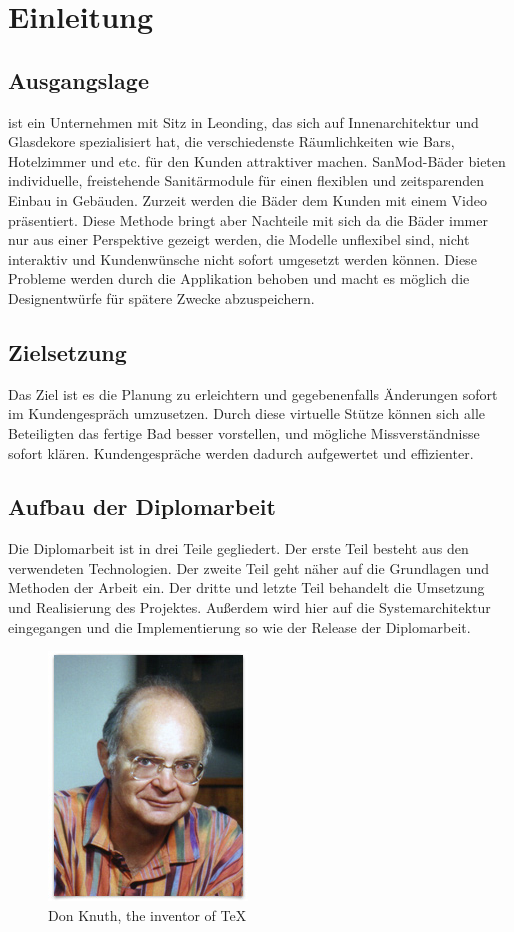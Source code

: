 \chapter{Einleitung}
\section{Ausgangslage}
{\projectpartner} ist ein Unternehmen mit Sitz in Leonding, das sich auf Innenarchitektur und Glasdekore spezialisiert hat, die verschiedenste Räumlichkeiten wie Bars, Hotelzimmer und etc. für den Kunden attraktiver machen. SanMod-Bäder bieten individuelle, freistehende Sanitärmodule für einen flexiblen und zeitsparenden Einbau in Gebäuden. Zurzeit werden die Bäder dem Kunden mit einem Video präsentiert. Diese Methode bringt aber Nachteile mit sich da die Bäder immer nur aus einer Perspektive gezeigt werden, die Modelle unflexibel sind, nicht interaktiv und Kundenwünsche nicht sofort umgesetzt werden können. Diese Probleme werden durch die Applikation behoben und macht es möglich die Designentwürfe für spätere Zwecke abzuspeichern.

\section{Zielsetzung}
Das Ziel ist es die Planung zu erleichtern und gegebenenfalls Änderungen sofort im Kundengespräch umzusetzen. Durch diese virtuelle Stütze können sich alle Beteiligten das fertige Bad besser vorstellen, und mögliche Missverständnisse sofort klären. Kundengespräche werden dadurch aufgewertet und effizienter.

\section{Aufbau der Diplomarbeit}
Die Diplomarbeit ist in drei Teile gegliedert. 
Der erste Teil besteht aus den verwendeten Technologien.
Der zweite Teil geht näher auf die Grundlagen und Methoden der Arbeit ein.
Der dritte und letzte Teil behandelt die Umsetzung und Realisierung des Projektes.
Außerdem wird hier auf die Systemarchitektur eingegangen und die Implementierung so wie
der Release der Diplomarbeit.


\begin{figure}
\begin{center}
	\includegraphics[scale=.5]{images/don_knuth.jpg}
\end{center}
	\caption{Don Knuth, the inventor of \TeX}
	\label{fig:sample}
\end{figure}

